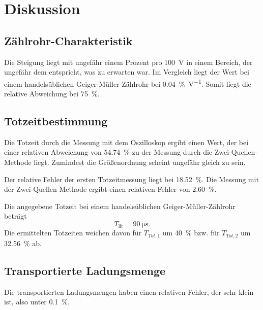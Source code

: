 \section{Diskussion}
\label{sec:Diskussion}

\subsection{Zählrohr-Charakteristik}

Die Steigung liegt mit ungefähr einem Prozent pro \SI{100}{\volt} in einem Bereich, der ungefähr dem entspricht, was zu erwarten war. Im Vergleich liegt der Wert bei einem handelsüblichen Geiger-Müller-Zählrohr \cite{vergleich} bei \SI{0.04}{\percent\per\volt}. Somit liegt die relative Abweichung bei \SI{75}{\percent}.   %

\subsection{Totzeitbestimmung}

Die Totzeit durch die Messung mit dem Oszilloskop ergibt einen Wert, der bei einer relativen Abweichung von \SI{54.74}{\percent} zu der Messung durch die Zwei-Quellen-Methode liegt. 
Zumindest die Größenordnung scheint ungefähr gleich zu sein. 

\noindent Der relative Fehler der ersten Totzeitmessung liegt bei \SI{18.52}{\percent}. Die Messung mit der Zwei-Quellen-Methode ergibt einen relativen Fehler von \SI{2.60}{\percent}.

\noindent Die angegebene Totzeit bei einem handelsüblichen Geiger-Müller-Zählrohr \cite{vergleich} beträgt
\begin{equation*}
    T_\text{lit} = \SI{90}{\micro\second}.
\end{equation*}
Die ermittelten Totzeiten weichen davon für $T_{Tot,1}$ um \SI{40}{\percent} bzw. für $T_{Tot,2}$ um \SI{32.56}{\percent} ab.

\subsection{Transportierte Ladungsmenge}

Die transportierten Ladungsmengen haben einen relativen Fehler, der sehr klein ist, also unter \SI{0.1}{\percent}. %
